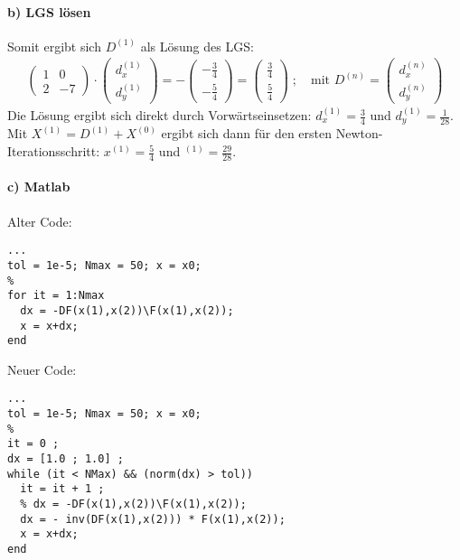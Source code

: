 \paragraph*{b) LGS lösen}
Somit ergibt sich $D^{(1)}$ als Lösung des LGS:
\begin{align*}
  \begin{pmatrix}1 & 0 \\ 2 & -7\end{pmatrix} \cdot
  \begin{pmatrix}d_x^{(1)} \\ d_y^{(1)}\end{pmatrix} =
  - \begin{pmatrix}-\frac{3}{4} \\ -\frac{5}{4}\end{pmatrix} =
  \begin{pmatrix}\frac{3}{4} \\ \frac{5}{4}\end{pmatrix} \; ; \quad
  \text{mit } D^{(n)} = \begin{pmatrix}d_x^{(n)} \\ d_y^{(n)}\end{pmatrix}
\end{align*}
Die Lösung ergibt sich direkt durch Vorwärtseinsetzen: $d_x^{(1)} = \frac{3}{4}$
und $d_y^{(1)} = \frac{1}{28}$. Mit $X^{(1)} = D^{(1)} + X^{(0)}$ ergibt sich dann
für den ersten Newton-Iterationsschritt:
$x^{(1)} = \frac{5}{4}$ und $^{(1)} = \frac{29}{28}$.

\paragraph*{c) Matlab}
Alter Code:
\begin{verbatim}
...
tol = 1e-5; Nmax = 50; x = x0;
%
for it = 1:Nmax
  dx = -DF(x(1),x(2))\F(x(1),x(2));
  x = x+dx;
end
\end{verbatim}
Neuer Code:
\begin{verbatim}
...
tol = 1e-5; Nmax = 50; x = x0;
%
it = 0 ;
dx = [1.0 ; 1.0] ;
while (it < NMax) && (norm(dx) > tol))
  it = it + 1 ;
  % dx = -DF(x(1),x(2))\F(x(1),x(2));
  dx = - inv(DF(x(1),x(2))) * F(x(1),x(2));
  x = x+dx;
end
\end{verbatim}
